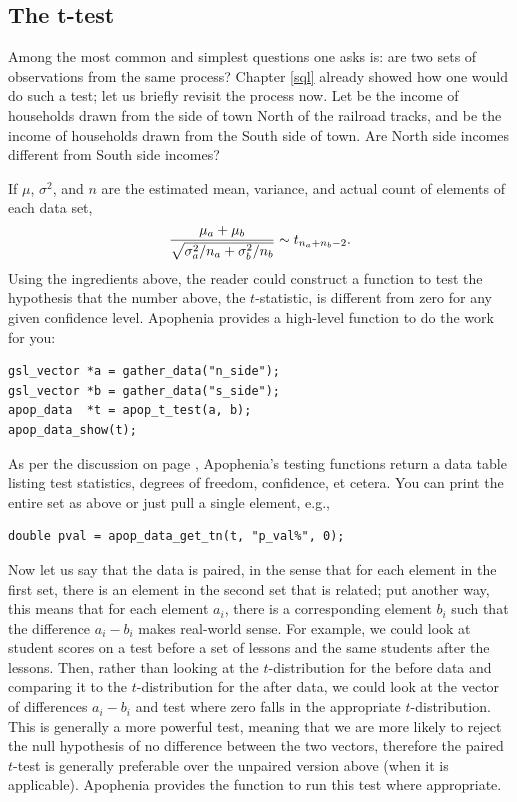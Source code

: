 \subsection{The t-test} \label{ttest} 
Among the most common and simplest questions one asks is: are two 
sets of observations from the same process? Chapter \ref{sql} already showed how one
would do such a test; let us briefly revisit the process now.
Let  be the income of households
drawn from the side of town North of the railroad tracks, and
 be the income of households drawn from the South side of
town. Are North side incomes different from South side incomes? 

If $\mu$,
$\sigma^2$, and $n$ are the estimated mean, variance, and actual count
of elements of each data set,
$${\mu_a + \mu_b \over \sqrt{\sigma^2_a/n_a + \sigma^2_b/n_b}} \sim t_{n_a + n_b -2}.$$
Using the ingredients above, the reader could construct a function to
test the hypothesis that the number above, the $t$-statistic, is
different from zero for any given confidence level. Apophenia provides a
high-level function to do the work for you:

\begin{lstlisting}
gsl_vector *a = gather_data("n_side");
gsl_vector *b = gather_data("s_side");
apop_data  *t = apop_t_test(a, b);
apop_data_show(t);
\end{lstlisting}
As per the discussion on page \pageref{testoutput}, Apophenia's testing
functions return a data table listing test statistics, degrees of
freedom, confidence, et cetera. You can print the entire set as above or
just pull a single element, e.g.,
\begin{lstlisting}
double pval = apop_data_get_tn(t, "p_val%", 0);
\end{lstlisting}

Now let us say that the data is paired, in the sense that for each
element in the first set, there is an element in the second set that is
related; put another way, this means that for each element $a_i$, there
is a corresponding element $b_i$ such that the difference $a_i - b_i$
makes real-world sense. For example, we could look at student scores on
a test before a set of lessons and the same students after the lessons.
Then, rather than looking at the $t$-distribution for the before data
and comparing it to the $t$-distribution for the after data, we could
look at the vector of differences $a_i - b_i$ and test where zero falls
in the appropriate $t$-distribution. This is generally a more powerful test,
meaning that we are more likely to reject the null hypothesis of no
difference between the two vectors, therefore the paired $t$-test is
generally preferable over the unpaired version above (when it is
applicable). Apophenia provides the 
function to run this test where appropriate.

